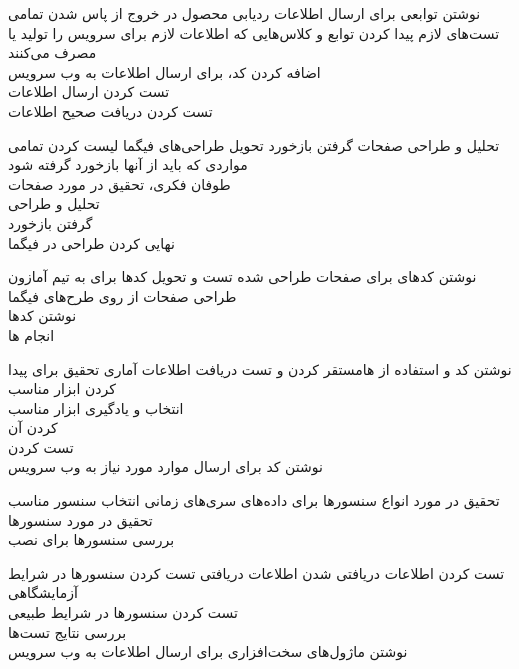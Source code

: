 \begin{wbsbox}{}
\begin{wbssub}
{نوشتن توابعی برای ارسال اطلاعات ردیابی محصول در خروج از }
{پاس شدن تمامی تست‌های لازم}
پیدا کردن توابع و کلاس‌هایی که اطلاعات لازم برای سرویس را تولید یا مصرف می‌کنند \\
\task 
اضافه کردن کد، برای ارسال اطلاعات به وب ‌سرویس \\
\task
تست کردن ارسال اطلاعات \\
\task
تست کردن دریافت صحیح اطلاعات
\end{wbssub}

\begin{wbssub}
{تحلیل و طراحی صفحات گرفتن بازخورد}
{تحویل طراحی‌‌های فیگما}
\task
لیست کردن تمامی مواردی که باید از آنها بازخورد گرفته شود \\
\task
طوفان فکری،‌ تحقیق در مورد صفحات \\
\task
تحلیل و طراحی \\
\task
گرفتن بازخورد \\
\task
نهایی کردن طراحی در فیگما
\end{wbssub}

\begin{wbssub}
{نوشتن کد‌های  برای صفحات طراحی شده}
{تست و تحویل کد‌ها برای به تیم  آمازون}
\task
طراحی صفحات از روی طرح‌های فیگما \\
\task
نوشتن کد‌ها \\
\task
انجام ‌ها \\
\end{wbssub}

\begin{wbssub}
{نوشتن کد و استفاده از ها}{مستقر کردن و تست دریافت اطلاعات آماری}
\task
تحقیق برای پیدا کردن ابزار مناسب \\
\task
انتخاب و یادگیری ابزار مناسب \\
\task
{} کردن آن\\
\task
تست کردن \\
\task
نوشتن کد برای ارسال موارد مورد نیاز به وب سرویس
\end{wbssub}

\begin{wbssub}
{تحقیق در مورد انواع سنسور‌ها برای داده‌های سری‌های زمانی}
{انتخاب سنسور مناسب}
\task
تحقیق در مورد سنسور‌ها \\
\task
بررسی سنسور‌ها برای نصب
\end{wbssub}
\begin{wbssub}
{تست کردن اطلاعات دریافتی}
{ شدن اطلاعات دریافتی}
\task
تست کردن سنسورها در شرایط آزمایشگاهی \\
\task
تست کردن سنسورها در شرایط طبیعی \\
\task
بررسی نتایج تست‌ها \\
\task
نوشتن ماژول‌های سخت‌افزاری برای ارسال اطلاعات به وب ‌سرویس
\end{wbssub}


\end{wbsbox}
